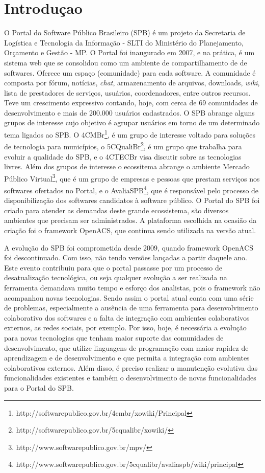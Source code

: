 ﻿\section{Introduçao}
\label{sec:introducao}

O Portal do Software Público Brasileiro (SPB) é um projeto da Secretaria de Logística e Tecnologia da Informação - SLTI do Ministério do Planejamento, Orçamento e Gestão - MP. O Portal foi inaugurado em 2007, e na prática,
é um sistema web que se consolidou como um ambiente de compartilhamento de
de softwares. 
%
Oferece um espaço (comunidade) para cada software. A comunidade é composta por
fórum, notícias, {\it chat}, armazenamento de arquivos, downloads, {\it wiki}, lista de
prestadores de serviços, usuários, coordenadores, entre outros recursos.
%
Teve um crescimento expressivo contando, hoje, com cerca de 69 comunidades de
desenvolvimento e mais de 200.000 usuários cadastrados.
%
O SPB abrange alguns grupos de interesse cujo objetivo é agrupar usuários em torno de um determinado tema ligados ao SPB. O 4CMBr\footnote{http://softwarepublico.gov.br/4cmbr/xowiki/Principal}, é um grupo de interesse voltado para soluções
de tecnologia para municípios, o 5CQualiBr\footnote{http://softwarepublico.gov.br/5cqualibr/xowiki/}, é um grupo que trabalha para
evoluir a qualidade do SPB, e o 4CTECBr visa discutir sobre as tecnologias livres.
%
Além dos grupos de interesse o ecossitema abrange o ambiente Mercado Público Virtual\footnote{http://www.softwarepublico.gov.br/mpv/}, que é um
grupo de empresas e pessoas que prestam serviços nos softwares ofertados no
Portal, e o AvaliaSPB\footnote{http://www.softwarepublico.gov.br/5cqualibr/avaliaspb/wiki/principal}, que é responsável pelo processo de disponibilização dos softwares candidatos à software
público.
%
O Portal do SPB foi criado para atender as demandas deste grande ecossistema, são diversos ambientes que precisam ser administrados. A plataforma escolhida na ocasião da
criação foi o framework OpenACS, que continua sendo utilizada na versão atual.


A evolução do SPB foi comprometida desde 2009, quando framework OpenACS foi 
descontinuado. Com isso, não tendo versões lançadas a partir daquele ano.
%
Este evento contribuiu para que o portal passasse por um processo de desatualização tecnológica, ou seja qualquer evolução a ser realizada na ferramenta demandava muito tempo e esforço dos analistas, 
pois o framework não acompanhou novas tecnologias. Sendo assim o portal atual conta com uma série de problemas, especialmente a ausência de uma ferramenta para desenvolvimento colaborativo dos softwares e a falta de integração com ambientes colaborativos
externos, as redes sociais, por exemplo.
Por isso, hoje, é necessária a evolução para novas tecnologias que tenham maior
suporte das comunidades de desenvolvimento, que utilize linguagens de programação
com maior rapidez de aprendizagem e de desenvolvimento e que permita a integração
com ambientes colaborativos externos.
%
Além disso, é preciso realizar a manutenção evolutiva das funcionalidades
existentes e também o desenvolvimento de novas funcionalidades para o Portal
do SPB.


